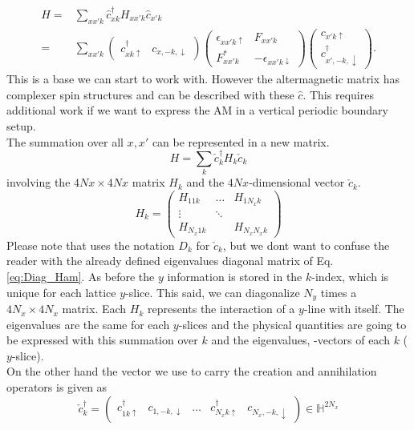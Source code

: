 \documentclass[../main.tex]{subfile}
\begin{document}
\begin{equation}
    \begin{aligned}
    H =& \sum_{xx'k} \hat{c}_{xk}^{\dagger} H_{xx'k} \hat{c}_{x'k}\\
      =& \sum_{xx'k} \begin{pmatrix}
        c^{\dagger}_{xk\uparrow} & c_{x,-k,\downarrow}
      \end{pmatrix}
        \begin{pmatrix}
            \epsilon_{xx'k\uparrow} & F_{xx'k}\\
            F_{xx'k}^{\ast} & -\epsilon_{xx'k\downarrow}
        \end{pmatrix}
        \begin{pmatrix}
            c_{x'k\uparrow}\\
            c^{\dagger}_{x',-k,\downarrow}
        \end{pmatrix}.
    \end{aligned}
\end{equation}
This is a base we can start to work with. However the altermagnetic matrix has complexer spin structures and can be described with these $\hat{c}$.
This requires additional work if we want to express the AM in a vertical periodic boundary setup.\\
The summation over all $x,x'$ can be represented in a new matrix.
\[
    H = \sum_k \check{c}_k^{\dagger} H_k \check{c}_k
\]
involving the $4Nx \times 4Nx$ matrix $H_k$ and the $4Nx$-dimensional vector $\check{c}_k$. 
\[
    H_k = \begin{pmatrix}
        H_{11k} &\dots & H_{1N_xk}\\
        \vdots&\ddots&\\
        H_{N_x1k} & & H_{N_xN_xk}
    \end{pmatrix}
\]
Please note that \cite{Mjos2019} uses the notation $D_k$ for $\check{c}_k$, but we dont want to confuse the reader with the already defined eigenvalues
 diagonal matrix of Eq.\ref{eq:Diag_Ham}.
As before the $y$ information is stored in the $k$-index, which is unique for each lattice $y$-slice. This said, we 
can diagonalize $N_y$ times a $4N_x \times 4N_x$ matrix. Each $H_k$ represents the interaction of a $y$-line with itself.
The eigenvalues are the same for each $y$-slices and the physical
quantities are going to be expressed with this summation over $k$ and the eigenvalues, -vectors of each $k$ ($y$-slice).\\

On the other hand the vector we use to carry the creation and annihilation operators is given as 
\[
    \check{c}_k^{\dagger} = \begin{pmatrix}
        c^{\dagger}_{1k\uparrow} & c_{1,-k,\downarrow}& \dots &c^{\dagger}_{N_x k\uparrow} & c_{N_x,-k,\downarrow}
    \end{pmatrix}\in\mathbb{H}^{2N_x}
\]
\end{document}
